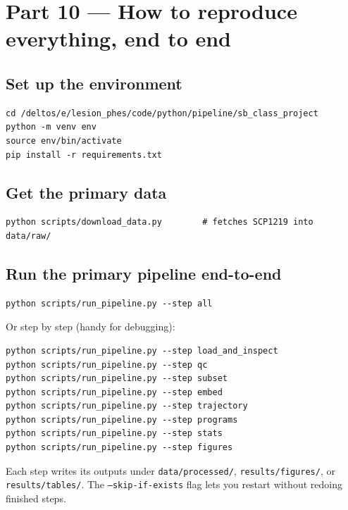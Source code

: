 \documentclass[11pt]{article}
\begin{document}
\section{Part 10 --- How to reproduce everything, end to end}

\subsection{Set up the environment}

\begin{verbatim}
cd /deltos/e/lesion_phes/code/python/pipeline/sb_class_project
python -m venv env
source env/bin/activate
pip install -r requirements.txt
\end{verbatim}

\subsection{Get the primary data}

\begin{verbatim}
python scripts/download_data.py        # fetches SCP1219 into data/raw/
\end{verbatim}

\subsection{Run the primary pipeline end-to-end}

\begin{verbatim}
python scripts/run_pipeline.py --step all
\end{verbatim}

Or step by step (handy for debugging):
\begin{verbatim}
python scripts/run_pipeline.py --step load_and_inspect
python scripts/run_pipeline.py --step qc
python scripts/run_pipeline.py --step subset
python scripts/run_pipeline.py --step embed
python scripts/run_pipeline.py --step trajectory
python scripts/run_pipeline.py --step programs
python scripts/run_pipeline.py --step stats
python scripts/run_pipeline.py --step figures
\end{verbatim}

Each step writes its outputs under \texttt{data/processed/}, \texttt{results/figures/},
or \texttt{results/tables/}. The \texttt{--skip-if-exists} flag lets you
restart without redoing finished steps.
\end{document}
